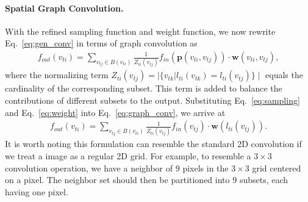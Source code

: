 \documentclass[letterpaper]{article} \usepackage{aaai18}  \usepackage{times}  \usepackage{helvet}  \usepackage{courier}  \usepackage{url}  \usepackage{graphicx}
\begin{document}
\paragraph{Spatial Graph Convolution.}
With the refined sampling function and weight function, we now rewrite Eq.~\ref{eq:gen_conv} in terms of graph convolution as
\begin{align}
	\label{eq:graph_conv}
	f_{out}(v_{ti}) = \sum_{v_{tj}\in B(v_{ti})} \frac{1}{Z_{ti}(v_{tj})}f_{in}(\mathbf{p}(v_{ti}, v_{tj}))\cdot \mathbf{w}(v_{ti}, v_{tj}), 
\end{align}
where the normalizing term 
$
Z_{ti}(v_{tj}) = \mid\{ v_{tk} |  l_{ti}(v_{tk}) = l_{ti}(v_{tj})\}\mid
$
equals the cardinality of the corresponding subset.
This term is added to balance the contributions of different subsets to the output.
Substituting Eq.~\ref{eq:sampling} and Eq.~\ref{eq:weight} into Eq.~\ref{eq:graph_conv}, we arrive at
\begin{align}
		\label{eq:graph_conv_simplify}
		f_{out}(v_{ti}) = \sum_{v_{tj}\in B(v_{ti})} \frac{1}{Z_{ti}(v_{tj})}f_{in}(v_{tj})\cdot \mathbf{w}(l_{ti}(v_{tj})).
\end{align}
It is worth noting this formulation can resemble the standard 2D convolution if we treat a image as a regular 2D grid.
For example, to resemble a $ 3\times 3 $ convolution operation, we have a neighbor of $ 9 $ pixels in the $ 3\times 3 $ grid centered on a pixel. 
The neighbor set should then be partitioned into $ 9 $ subsets, each having one pixel.
\end{document}
